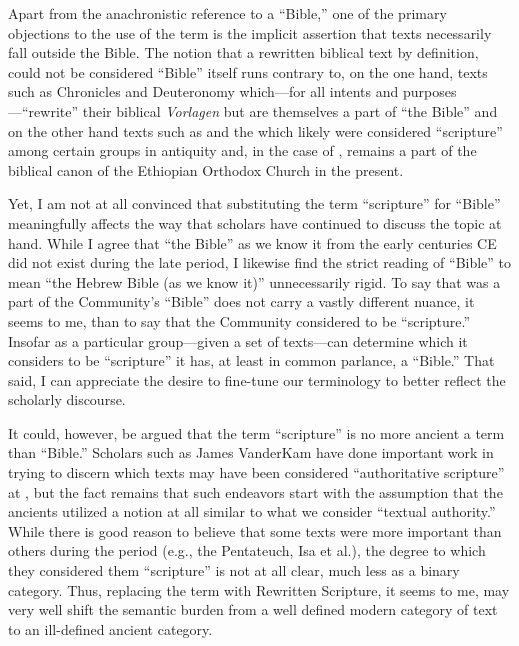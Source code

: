  Apart from the anachronistic reference to a ``Bible,'' one of the primary objections to the use of the term \rwb is the implicit assertion that \rwb texts necessarily fall outside the Bible.\autocite[61]{campbell_zsengeller2014} The notion that a rewritten biblical text by definition, could not be considered ``Bible'' itself runs contrary to, on the one hand, texts such as Chronicles and Deuteronomy which---for all intents and purposes---``rewrite'' their biblical \emph{Vorlagen} but are themselves a part of ``the Bible'' and on the other hand texts such as \jub and the \templescroll which likely were considered ``scripture'' among certain groups in antiquity and, in the case of \jub, remains a part of the biblical canon of the Ethiopian Orthodox Church in the present. 

 Yet, I am not at all convinced that substituting the term ``scripture'' for ``Bible'' meaningfully affects the way that scholars have continued to discuss the topic at hand. While I agree that ``the Bible'' as we know it from the early centuries CE did not exist during the late \secondtemple period, I likewise find the strict reading of ``Bible'' to mean ``the Hebrew Bible (as we know it)'' unnecessarily rigid. To say that \jub was a part of the \qumran Community's ``Bible'' does not carry a vastly different nuance, it seems to me, than to say that the \qumran Community considered \jub to be ``scripture.'' Insofar as a particular group---given a set of texts---can determine which it considers to be ``scripture'' it has, at least in common parlance, a ``Bible.'' That said, I can appreciate the desire to fine-tune our terminology to better reflect the scholarly discourse. 

 It could, however, be argued that the term ``scripture'' is no more ancient a term than ``Bible.'' Scholars such as James VanderKam have done important work in trying to discern which texts may have been considered ``authoritative scripture'' at \qumran,\autocite{vanderkam_dsd1998} but the fact remains that such endeavors start with the assumption that the ancients utilized a notion at all similar to what we consider ``textual authority.'' While there is good reason to believe that some texts were more important than others during the \secondtemple period (e.g., the Pentateuch, Isa et al.), the degree to which they considered them ``scripture'' is not at all clear, much less as a binary category. Thus, replacing the term \rwb with Rewritten Scripture, it seems to me, may very well shift the semantic burden from a well defined modern category of text to an ill-defined ancient category. 

